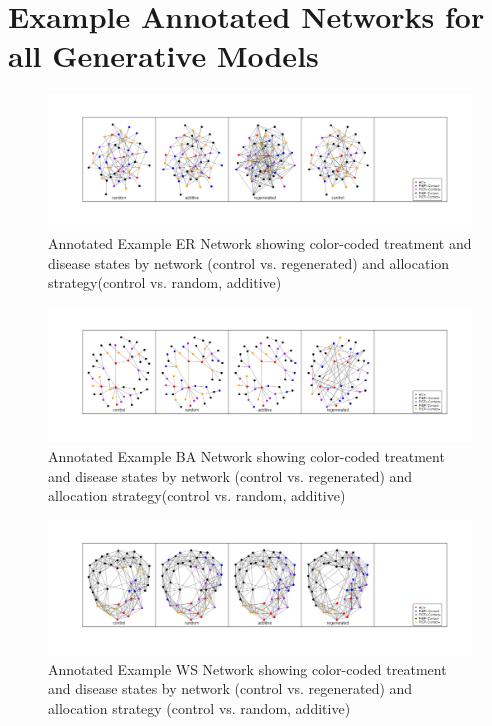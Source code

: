 \documentclass{article}
\theoremstyle{definition}
\begin{document}
\newpage
\section{Example Annotated Networks for all Generative Models}
\begin{figure}
    \centering
    \includegraphics[width=\linewidth]{Original Figures/ER Network Example.png}
    \caption{Annotated Example ER Network showing color-coded treatment and disease states by network (control vs. regenerated) and allocation strategy(control vs. random, additive)}
    \label{fig: C1}
\end{figure}
\begin{figure}[H]
    \centering
    \includegraphics[width=\linewidth]{Original Figures/BA Network Example.png}
    \caption{Annotated Example BA Network showing color-coded treatment and disease states by network (control vs. regenerated) and allocation strategy(control vs. random, additive)}
    \label{fig: C2}
\end{figure}
\begin{figure}[H]
    \centering
    \includegraphics[width=\linewidth]{Original Figures/WS Network Example.png}
    \caption{Annotated Example WS Network showing color-coded treatment and disease states by network (control vs. regenerated) and allocation strategy (control vs. random, additive)}
    \label{fig: C3}
\end{figure}
\end{document}

